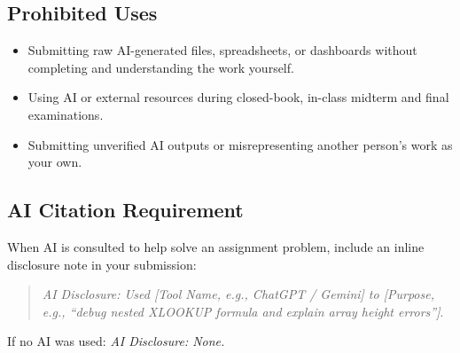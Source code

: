 \documentclass[11pt,a4paper]{article}
\begin{document}
\subsection*{Prohibited Uses}
\begin{itemize}[leftmargin=*]
    \item Submitting raw AI-generated files, spreadsheets, or dashboards without completing and understanding the work yourself.
    \item Using AI or external resources during closed-book, in-class midterm and final examinations.
    \item Submitting unverified AI outputs or misrepresenting another person's work as your own.
\end{itemize}

\subsection*{AI Citation Requirement}
When AI is consulted to help solve an assignment problem, include an inline disclosure note in your submission:
\begin{quote}
    \textit{AI Disclosure: Used [Tool Name, e.g., ChatGPT / Gemini] to [Purpose, e.g., ``debug nested XLOOKUP formula and explain array height errors'']}.
\end{quote}
If no AI was used: \textit{AI Disclosure: None.}
\end{document}
